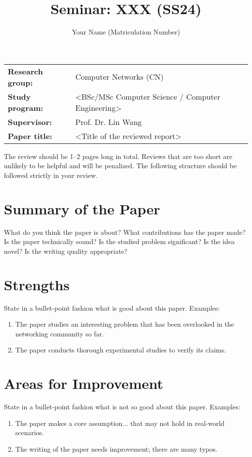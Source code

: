 \documentclass{upb-cn}
\title{Seminar: XXX (SS24)}
\author{Your Name (Matriculation Number)}
\begin{document}
\makethetitle

\begin{notebox}
    \begin{tabular}{@{}ll}
        \textbf{Research group:} & Computer Networks (CN) \\
        \textbf{Study program:} & <BSc/MSc Computer Science / Computer Engineering> \\
        \textbf{Supervisor:} & Prof. Dr. Lin Wang \\
        \textbf{Paper title:} & <Title of the reviewed report>
    \end{tabular}
\end{notebox}

The review should be 1--2 pages long in total. Reviews that are too short are unlikely to be helpful and will be penalized. The following structure should be followed strictly in your review.

\section{Summary of the Paper}

What do you think the paper is about? What contributions has the paper made? Is the paper technically sound? Is the studied problem significant? Is the idea novel? Is the writing quality appropriate?


\section{Strengths}

State in a bullet-point fashion what is good about this paper. Examples:

\begin{enumerate}
    \item The paper studies an interesting problem that has been overlooked in the networking community so far.
    \item The paper conducts thorough experimental studies to verify its claims. 
\end{enumerate}

\section{Areas for Improvement}

State in a bullet-point fashion what is not so good about this paper. Examples:

\begin{enumerate}
    \item The paper makes a core assumption... that may not hold in real-world scenarios.
    \item The writing of the paper needs improvement; there are many typos.
\end{enumerate}
\end{document}

